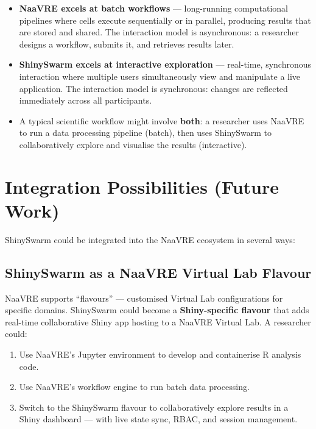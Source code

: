\documentclass[12pt,a4paper]{article}
\begin{document}
\begin{itemize}[nosep]
  \item \textbf{NaaVRE excels at batch workflows} --- long-running computational pipelines where cells execute sequentially or in parallel, producing results that are stored and shared. The interaction model is asynchronous: a researcher designs a workflow, submits it, and retrieves results later.
  
  \item \textbf{ShinySwarm excels at interactive exploration} --- real-time, synchronous interaction where multiple users simultaneously view and manipulate a live application. The interaction model is synchronous: changes are reflected immediately across all participants.
  
  \item A typical scientific workflow might involve \textbf{both}: a researcher uses NaaVRE to run a data processing pipeline (batch), then uses ShinySwarm to collaboratively explore and visualise the results (interactive).
\end{itemize}

\section{Integration Possibilities (Future Work)}

ShinySwarm could be integrated into the NaaVRE ecosystem in several ways:

\subsection{ShinySwarm as a NaaVRE Virtual Lab Flavour}

NaaVRE supports ``flavours'' --- customised Virtual Lab configurations for specific domains. ShinySwarm could become a \textbf{Shiny-specific flavour} that adds real-time collaborative Shiny app hosting to a NaaVRE Virtual Lab. A researcher could:

\begin{enumerate}[nosep]
  \item Use NaaVRE's Jupyter environment to develop and containerise R analysis code.
  \item Use NaaVRE's workflow engine to run batch data processing.
  \item Switch to the ShinySwarm flavour to collaboratively explore results in a Shiny dashboard --- with live state sync, RBAC, and session management.
\end{enumerate}
\end{document}
